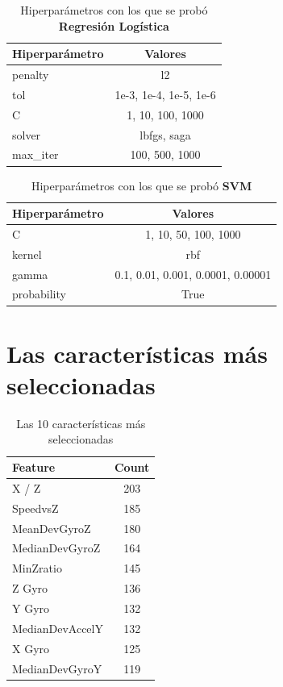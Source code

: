 \begin{appendices}
		

		\begin{table}[ht!]
			\centering
			\caption{Hiperparámetros con los que se probó \textbf{Regresión Logística}}
			\label{table:10}
			\begin{tabular}{lc}
				\toprule
				Hiperparámetro &                Valores \\
				\midrule
					   penalty &                     l2 \\
						   tol & 1e-3, 1e-4, 1e-5, 1e-6 \\
							 C &       1, 10, 100, 1000 \\
						solver &            lbfgs, saga \\
					  max\_iter &         100, 500, 1000 \\
				\bottomrule
			\end{tabular}
		\end{table}
		
		
		\begin{table}[htb]
			\centering
			\caption{Hiperparámetros con los que se probó \textbf{SVM}}
			\label{table:11}
			\begin{tabular}{lc}
			\toprule
			Hiperparámetro &                           Valores \\
			\midrule
						 C &              1, 10, 50, 100, 1000 \\
					kernel &                               rbf \\
					 gamma & 0.1, 0.01, 0.001, 0.0001, 0.00001 \\
			   probability &                              True \\
			\bottomrule
			\end{tabular}
		\end{table}

	\newpage
	\section*{Las características más seleccionadas}
		\begin{table}[htb]
			\centering
			\caption{Las 10 características más seleccionadas}
			\label{table:12}
				\begin{tabular}{lc}
				\toprule
						Feature &  Count \\
				\midrule
						  X / Z &    203 \\
					   SpeedvsZ &    185 \\
				   MeanDevGyroZ &    180 \\
				 MedianDevGyroZ &    164 \\
					  MinZratio &    145 \\
						 Z Gyro &    136 \\
						 Y Gyro &    132 \\
				MedianDevAccelY &    132 \\
						 X Gyro &    125 \\
				 MedianDevGyroY &    119 \\
				\bottomrule
				\end{tabular}
		\end{table}
	

\end{appendices}
